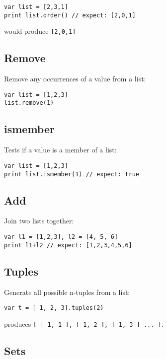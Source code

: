 \begin{lstlisting}
var list = [2,3,1]
print list.order() // expect: [2,0,1]
\end{lstlisting}

would produce \texttt{{[}2,0,1{]}}

\hypertarget{remove}{%
\subsection{Remove}\label{remove}}

Remove any occurrences of a value from a list:

\begin{lstlisting}
var list = [1,2,3]
list.remove(1)
\end{lstlisting}

\hypertarget{ismember}{%
\subsection{ismember}\label{ismember}}

Tests if a value is a member of a list:

\begin{lstlisting}
var list = [1,2,3]
print list.ismember(1) // expect: true
\end{lstlisting}

\hypertarget{add}{%
\subsection{Add}\label{add}}

Join two lists together:

\begin{lstlisting}
var l1 = [1,2,3], l2 = [4, 5, 6]
print l1+l2 // expect: [1,2,3,4,5,6]
\end{lstlisting}

\hypertarget{tuples}{%
\subsection{Tuples}\label{tuples}}

Generate all possible n-tuples from a list:

\begin{lstlisting}
var t = [ 1, 2, 3].tuples(2)
\end{lstlisting}

produces
\texttt{{[}\ {[}\ 1,\ 1\ {]},\ {[}\ 1,\ 2\ {]},\ {[}\ 1,\ 3\ {]}\ ...\ {]}}.

\hypertarget{sets}{%
\subsection{Sets}\label{sets}}

